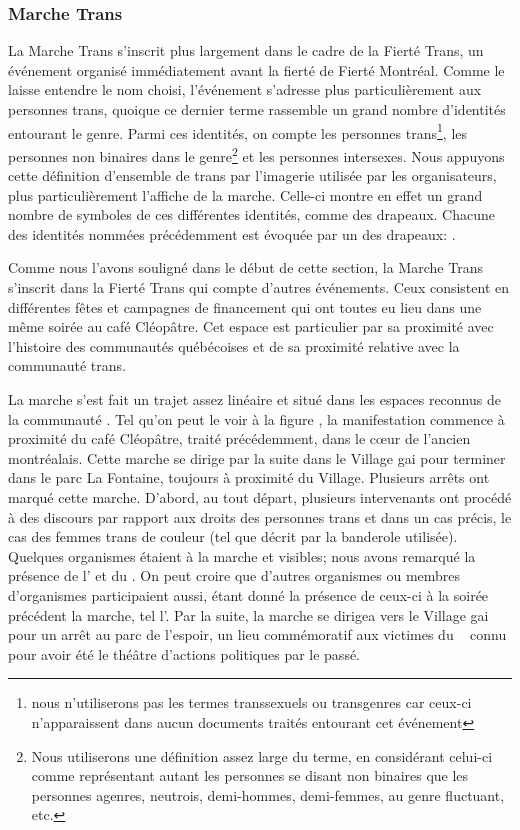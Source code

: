 \subsubsection{Marche Trans}
\label{subsubsec:marchetrans}
La Marche Trans s'inscrit plus largement dans le cadre de la Fierté Trans, un événement organisé immédiatement avant la fierté de Fierté Montréal. 
Comme le laisse entendre le nom choisi, l'événement s'adresse plus particulièrement aux personnes trans, quoique ce dernier terme rassemble un grand nombre d'identités entourant le genre. 
Parmi ces identités, on compte les personnes trans\footnote{nous n'utiliserons pas les termes transsexuels ou transgenres car ceux-ci n'apparaissent dans aucun documents traités entourant cet événement}, les personnes non binaires dans le genre\footnote{Nous utiliserons une définition assez large du terme, en   considérant celui-ci comme représentant autant les personnes se disant   non binaires que les personnes agenres, neutrois, demi-hommes, demi-femmes,   au genre fluctuant, etc.\citep[see][]{Barker2015}} et les personnes intersexes. 
Nous appuyons cette définition d'ensemble de trans par l'imagerie utilisée par les organisateurs, plus particulièrement l'affiche de la marche.
Celle-ci montre en effet un grand nombre de symboles de ces différentes identités, comme des drapeaux. 
Chacune des identités nommées précédemment est évoquée par un des drapeaux: .

Comme nous l'avons souligné dans le début de cette section, la Marche Trans s'inscrit dans la Fierté Trans qui compte d'autres événements. Ceux consistent en différentes fêtes et campagnes de financement qui ont toutes eu lieu dans une même soirée au café Cléopâtre. 
Cet espace est particulier par sa proximité avec l'histoire des communautés \lgbt{} québécoises et de sa proximité relative avec la communauté trans.

La marche s'est fait un trajet assez linéaire et situé dans les espaces reconnus de la communauté \lgbt{}. 
Tel qu'on peut le voir à la figure , la manifestation commence à proximité du café Cléopâtre, traité précédemment, dans le cœur de l'ancien  montréalais. 
Cette marche se dirige par la suite dans le Village gai pour terminer dans le parc La Fontaine, toujours à proximité du Village. 
Plusieurs arrêts ont marqué cette marche. 
D'abord, au tout départ, plusieurs intervenants ont procédé à des discours par rapport aux droits des personnes trans et dans un cas précis, le cas des femmes trans de couleur (tel que décrit par la banderole utilisée).
Quelques organismes étaient à la marche et visibles; nous avons remarqué la présence de l'\atq{} et du \rlq{}. 
On peut croire que d'autres organismes ou membres d'organismes participaient aussi, étant donné la présence de ceux-ci à la soirée précédent la marche, tel l'\astteq{}. 
Par la suite, la marche se dirigea vers le Village gai pour un arrêt au parc de l'espoir, un lieu commémoratif aux victimes du \sida{}~\citep{Lafontaine2012} connu pour avoir été le théâtre d'actions politiques par le passé.

